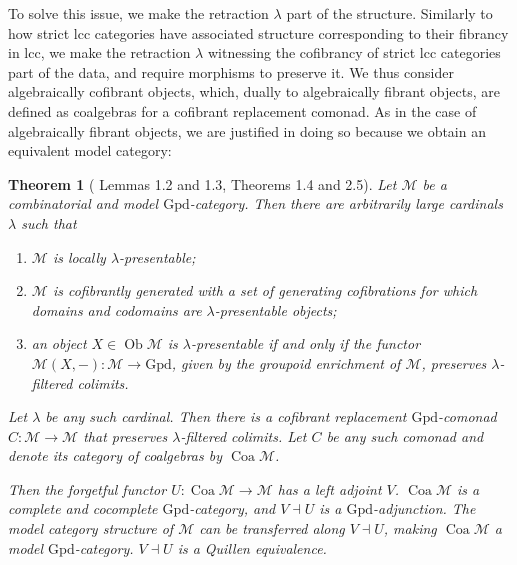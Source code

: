\documentclass[a4paper]{article}
\newtheorem{theorem}{Theorem}
\theoremstyle{remark}
\theoremstyle{definition}
\begin{document}
To solve this issue, we make the retraction $\lambda$ part of the structure.
Similarly to how strict lcc categories have associated structure corresponding to their fibrancy in lcc, we make the retraction $\lambda$ witnessing the cofibrancy of strict lcc categories part of the data, and require morphisms to preserve it.
We thus consider algebraically cofibrant objects, which, dually to algebraically fibrant objects, are defined as coalgebras for a cofibrant replacement comonad.
As in the case of algebraically fibrant objects, we are justified in doing so because we obtain an equivalent model category:

\begin{theorem}[\cite{coalgebraic-models} Lemmas 1.2 and 1.3, Theorems 1.4 and 2.5]
  \label{th:coalgebraic-model-category}
  Let $\mathcal{M}$ be a combinatorial and model $\mathrm{Gpd}$-category.
  Then there are arbitrarily large cardinals $\lambda$ such that
  \begin{enumerate}
    \item
      $\mathcal{M}$ is locally $\lambda$-presentable;
    \item
      $\mathcal{M}$ is cofibrantly generated with a set of generating cofibrations for which domains and codomains are $\lambda$-presentable objects;
    \item
      an object $X \in \operatorname{Ob} \mathcal{M}$ is $\lambda$-presentable if and only if the functor $\mathcal{M}(X, -) : \mathcal{M} \rightarrow \mathrm{Gpd}$, given by the groupoid enrichment of $\mathcal{M}$, preserves $\lambda$-filtered colimits.
  \end{enumerate}

  Let $\lambda$ be any such cardinal.
  Then there is a cofibrant replacement $\mathrm{Gpd}$-comonad $C : \mathcal{M} \rightarrow \mathcal{M}$ that preserves $\lambda$-filtered colimits. 
  Let $C$ be any such comonad and denote its category of coalgebras by $\operatorname{Coa} \mathcal{M}$.

  Then the forgetful functor $U : \operatorname{Coa} \mathcal{M} \rightarrow \mathcal{M}$ has a left adjoint $V$.
  $\operatorname{Coa} \mathcal{M}$ is a complete and cocomplete $\mathrm{Gpd}$-category, and $V \dashv U$ is a $\mathrm{Gpd}$-adjunction.
  The model category structure of $\mathcal{M}$ can be transferred along $V \dashv U$, making $\operatorname{Coa} \mathcal{M}$ a model $\mathrm{Gpd}$-category.
  $V \dashv U$ is a Quillen equivalence.
\end{theorem}
\end{document}
